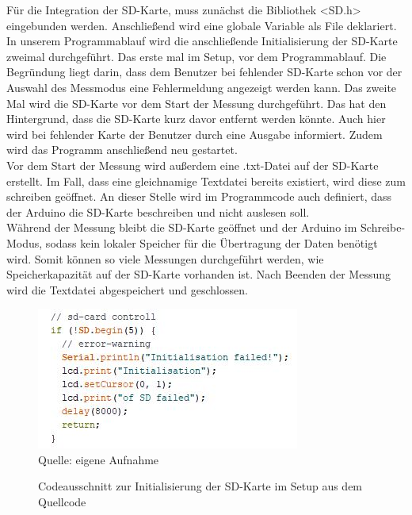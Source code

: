 Für die Integration der SD-Karte, muss zunächst die Bibliothek <SD.h> eingebunden werden. Anschließend wird eine globale Variable als File deklariert. In unserem Programmablauf wird die anschließende Initialisierung der SD-Karte zweimal durchgeführt. Das erste mal im Setup, vor dem Programmablauf. Die Begründung liegt darin, dass dem Benutzer bei fehlender SD-Karte schon vor der Auswahl des Messmodus eine Fehlermeldung angezeigt werden kann. Das zweite Mal wird die SD-Karte vor dem Start der Messung durchgeführt. Das hat den Hintergrund, dass die SD-Karte kurz davor entfernt werden könnte. Auch hier wird bei fehlender Karte der Benutzer durch eine Ausgabe informiert. Zudem wird das Programm anschließend neu gestartet. \\
Vor dem Start der Messung wird außerdem eine .txt-Datei auf der SD-Karte erstellt. Im Fall, dass eine gleichnamige Textdatei bereits existiert, wird diese zum schreiben geöffnet. An dieser Stelle wird im Programmcode auch definiert, dass der Arduino die SD-Karte beschreiben und nicht auslesen soll. \\
Während der Messung bleibt die SD-Karte geöffnet und der Arduino im Schreibe-Modus, sodass kein lokaler Speicher für die Übertragung der Daten benötigt wird. Somit können so viele Messungen durchgeführt werden, wie Speicherkapazität auf der SD-Karte vorhanden ist. Nach Beenden der Messung wird die Textdatei abgespeichert und geschlossen.

\begin{figure}[!hbt]
	\centering
	\includegraphics[width=0.5\linewidth]{Images/sdSetup}
	\footnotesize{\\ Quelle: eigene Aufnahme}
	\caption{Codeausschnitt zur Initialisierung der SD-Karte im Setup aus dem Quellcode}
	\label{fig:SD_Setup}
\end{figure}

